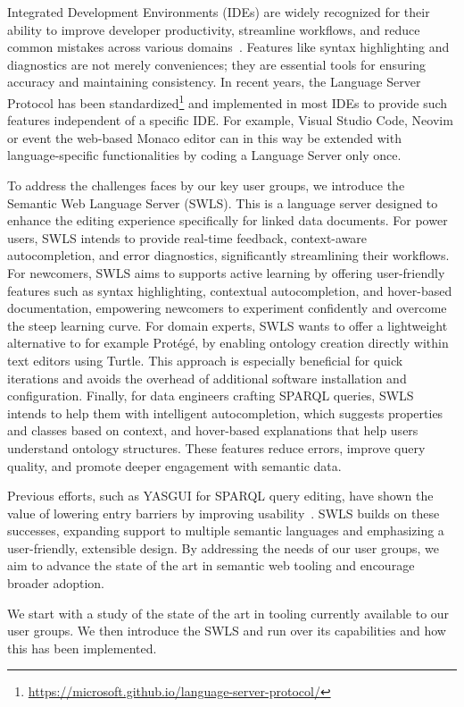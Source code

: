 Integrated Development Environments (IDEs) are widely recognized for their ability to improve developer productivity, streamline workflows, and reduce common mistakes across various domains~\cite{javaEngineer}. 
Features like syntax highlighting and diagnostics are not merely conveniences; they are essential tools for ensuring accuracy and maintaining consistency. 
In recent years, the Language Server Protocol has been standardized\footnote{\url{https://microsoft.github.io/language-server-protocol/}} and implemented in most IDEs to provide such features independent of a specific IDE.
For example, Visual Studio Code, Neovim or event the web-based Monaco editor can in this way be extended with language-specific functionalities by coding a Language Server only once.

To address the challenges faces by our key user groups, we introduce the Semantic Web Language Server (SWLS).
This is a language server designed to enhance the editing experience specifically for linked data documents. 
For power users, SWLS intends to provide real-time feedback, context-aware autocompletion, and error diagnostics, significantly streamlining their workflows.
For newcomers, SWLS aims to supports active learning by offering user-friendly features such as syntax highlighting, contextual autocompletion, and hover-based documentation, empowering newcomers to experiment confidently and overcome the steep learning curve.
For domain experts, SWLS wants to offer a lightweight alternative to for example Protégé, by enabling ontology creation directly within text editors using Turtle.
This approach is especially beneficial for quick iterations and avoids the overhead of additional software installation and configuration.
Finally, for data engineers crafting SPARQL queries, SWLS intends to help them with intelligent autocompletion, which suggests properties and classes based on context, and hover-based explanations that help users understand ontology structures.
These features reduce errors, improve query quality, and promote deeper engagement with semantic data.


Previous efforts, such as YASGUI for SPARQL query editing, have shown the value of lowering entry barriers by improving usability~\cite{10.3233/SW-150197,10.1007/978-3-642-41242-4_7}. 
SWLS builds on these successes, expanding support to multiple semantic languages and emphasizing a user-friendly, extensible design. 
By addressing the needs of our user groups, we aim to advance the state of the art in semantic web tooling and encourage broader adoption.

We start with a study of the state of the art in tooling currently available to our user groups.
We then introduce the SWLS and run over its capabilities and how this has been implemented.
